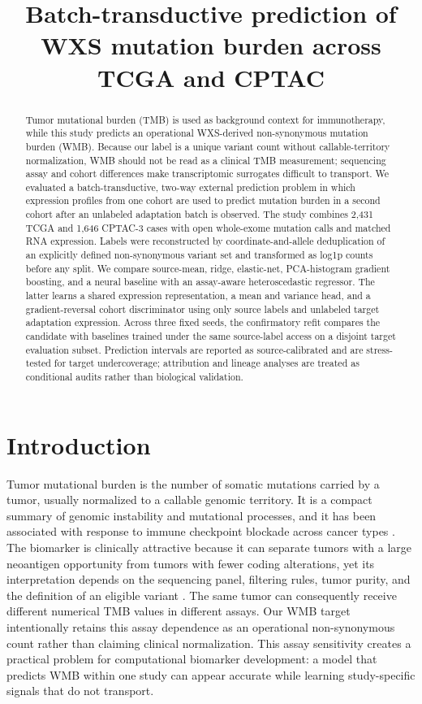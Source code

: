 \documentclass[11pt]{article}
\title{Batch-transductive prediction of WXS mutation burden across TCGA and CPTAC}
\author{}
\date{}
\begin{document}
\maketitle

\begin{abstract}
Tumor mutational burden (TMB) is used as background context for immunotherapy, while this study predicts an operational WXS-derived non-synonymous mutation burden (WMB). Because our label is a unique variant count without callable-territory normalization, WMB should not be read as a clinical TMB measurement; sequencing assay and cohort differences make transcriptomic surrogates difficult to transport. We evaluated a batch-transductive, two-way external prediction problem in which expression profiles from one cohort are used to predict mutation burden in a second cohort after an unlabeled adaptation batch is observed. The study combines 2,431 TCGA and 1,646 CPTAC-3 cases with open whole-exome mutation calls and matched RNA expression. Labels were reconstructed by coordinate-and-allele deduplication of an explicitly defined non-synonymous variant set and transformed as log1p counts before any split. We compare source-mean, ridge, elastic-net, PCA-histogram gradient boosting, and a neural baseline with an assay-aware heteroscedastic regressor. The latter learns a shared expression representation, a mean and variance head, and a gradient-reversal cohort discriminator using only source labels and unlabeled target adaptation expression. Across three fixed seeds, the confirmatory refit compares the candidate with baselines trained under the same source-label access on a disjoint target evaluation subset. Prediction intervals are reported as source-calibrated and are stress-tested for target undercoverage; attribution and lineage analyses are treated as conditional audits rather than biological validation.
\end{abstract}

\section{Introduction}
Tumor mutational burden is the number of somatic mutations carried by a tumor, usually normalized to a callable genomic territory. It is a compact summary of genomic instability and mutational processes, and it has been associated with response to immune checkpoint blockade across cancer types \citep{ZR2017f004a,RM2019bd13b,AM2017f218c,DL2021e47f7}. The biomarker is clinically attractive because it can separate tumors with a large neoantigen opportunity from tumors with fewer coding alterations, yet its interpretation depends on the sequencing panel, filtering rules, tumor purity, and the definition of an eligible variant \citep{M2017ddb97,MD2018d4430,D20209d1b5}. The same tumor can consequently receive different numerical TMB values in different assays. Our WMB target intentionally retains this assay dependence as an operational non-synonymous count rather than claiming clinical normalization. This assay sensitivity creates a practical problem for computational biomarker development: a model that predicts WMB within one study can appear accurate while learning study-specific signals that do not transport.
\end{document}
